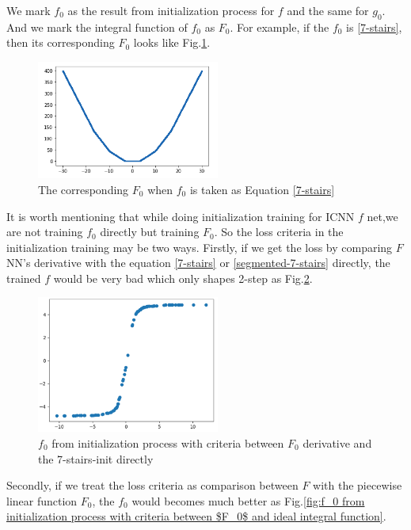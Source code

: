 \documentclass[conference,compsoc]{IEEEtran}
\begin{document}
We mark $f_0$ as the result from initialization process for $f$ and the same for $g_0$. And we mark the integral function of $f_0$ as $F_0$. For example, if the $f_0$ is \eqref{7-stairs}, then its corresponding $F_0$ looks like Fig.\ref{fig:The corresponding $F_0$ when $f_0$ is taken as Equation}.
\begin{figure}[htp]
  \centering
  \includegraphics[width=6cm]{images/piecewise_linear.png}
  \caption{The corresponding $F_0$ when $f_0$ is taken as Equation \eqref{7-stairs}}
  \label{fig:The corresponding $F_0$ when $f_0$ is taken as Equation}
\end{figure}

It is worth mentioning that while doing initialization training for ICNN $f$ net,we are not training $f_0$ directly but training $F_0$. So the loss criteria in the initialization training may be two ways. Firstly, if we get the loss by comparing $F$ NN's derivative with the equation \eqref{7-stairs} or \eqref{segmented-7-stairs} directly, the trained $f$ would be very bad which only shapes 2-step as Fig.\ref{fig:$f_0$ from initialization process with criteria between $F_0$ derivative and the 7-stairs-init directly}.

\begin{figure}[htp]
  \centering
  \includegraphics[width=6cm]{images/f_ICNN_withoutInit.png}
  \caption{$f_0$ from initialization process with criteria between $F_0$ derivative and the 7-stairs-init directly}
  \label{fig:$f_0$ from initialization process with criteria between $F_0$ derivative and the 7-stairs-init directly}
\end{figure}

Secondly, if we treat the loss criteria as comparison between $F$ with the piecewise linear function $F_0$, the $f_0$ would becomes much better as Fig.\ref{fig:f_0 from initialization process with criteria between $F_0$ and ideal integral function}.
\end{document}
